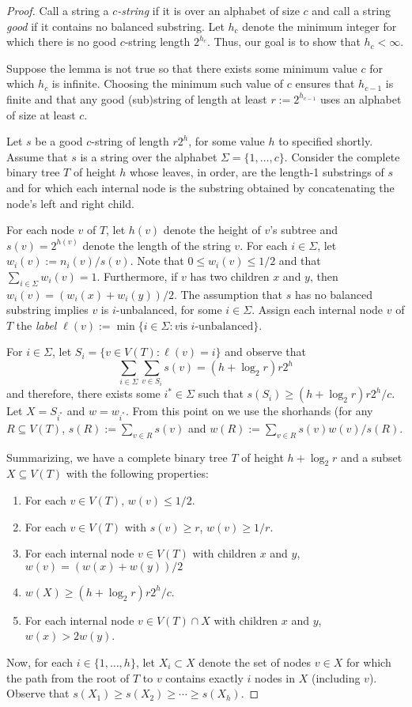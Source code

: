 \documentclass{patmorin}
\begin{document}
\begin{proof}
  Call a string a \emph{$c$-string} if it is over an alphabet of size $c$
  and call a string \emph{good} if it contains no balanced substring.  Let
  $h_c$ denote the minimum integer for which there is no good $c$-string
  length $2^{h_c}$.  Thus, our goal is to show that $h_c<\infty$.

  Suppose the lemma is not true so that there exists some minimum value
  $c$ for which $h_c$ is infinite.  Choosing the minimum such value of 
  $c$ ensures that $h_{c-1}$ is finite and that any good (sub)string of
  length at least $r:=2^{h_{c-1}}$ uses an alphabet of size at least $c$.

  Let $s$ be a good $c$-string of length $r2^{h}$, for some value $h$
  to specified shortly.  Assume that $s$ is a string over the alphabet
  $\Sigma=\{1,\ldots,c\}$. Consider the complete binary tree $T$ of
  height $h$ whose leaves, in order, are the length-1 substrings of
  $s$ and for which each internal node is the substring obtained by
  concatenating the node's left and right child.

  For each node $v$ of $T$, let $h(v)$ denote the height of $v$'s subtree
  and $s(v)=2^{h(v)}$ denote the length of the string $v$. For each
  $i\in\Sigma$, let $w_i(v):=n_i(v)/s(v)$.  Note that $0\le w_i(v)\le
  1/2$ and that $\sum_{i\in\Sigma} w_i(v)=1$.  Furthermore, if $v$
  has two children $x$ and $y$, then $w_i(v) = (w_i(x)+w_i(y))/2$.
  The assumption that $s$ has no balanced substring implies $v$ is
  $i$-unbalanced, for some $i\in\Sigma$.  Assign each internal node
  $v$ of $T$ the \emph{label} $\ell(v):=\min\{i\in\Sigma: \mbox{$v$
  is $i$-unbalanced}\}$.

  For $i\in\Sigma$, let $S_i=\{v\in V(T): \ell(v)=i\}$ and observe that 
  \[
      \sum_{i\in\Sigma} \sum_{v\in S_i} s(v) = (h+\log_2 r)r2^{h}
  \]
  and therefore, there exists some $i^*\in\Sigma$ such that
  $s(S_i)\ge (h+\log_2 r)r2^h/c$.  Let $X=S_{i^*}$ and $w=w_{i^*}$. From
  this point on we use the shorhands (for any $R\subseteq V(T)$, 
  $s(R):=\sum_{v\in R}s(v)$ and $w(R):=\sum_{v\in R}s(v)w(v)/s(R)$.

  Summarizing, we have a complete binary tree $T$ of height $h+\log_2 r$ and
  a subset $X\subseteq V(T)$ with the following properties: 
  \begin{enumerate}
    \item For each $v\in V(T)$, $w(v) \le 1/2$.
    \item For each $v\in V(T)$ with $s(v) \ge r$, $w(v)\ge 1/r$.
    \item For each internal node $v\in V(T)$ with children $x$ and $y$,
       $w(v) = (w(x)+w(y))/2$
    \item $w(X) \ge (h+\log_2 r)r2^{h}/c$.
     \item For each internal node $v\in V(T)\cap X$ with children $x$ and $y$,
       $w(x) > 2w(y)$.
  \end{enumerate}
  Now, for each $i\in\{1,\ldots,h\}$, let $X_i\subset X$ denote the
  set of nodes $v\in X$ for which the path from the root of $T$ to $v$
  contains exactly $i$ nodes in $X$ (including $v$).  Observe that $s(X_1)
  \ge s(X_2) \ge \cdots\ge s(X_h)$.


\end{proof}
\end{document}
